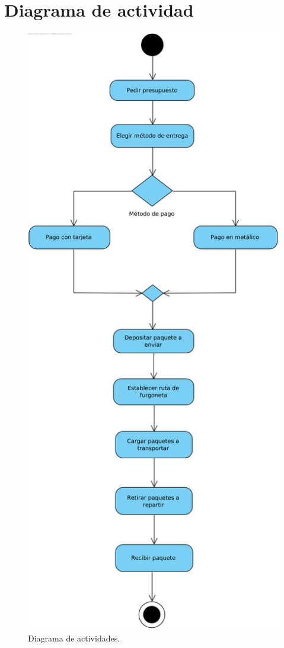 \documentclass[12pt,spanish]{article}
\begin{document}
\section{Diagrama de actividad}
\begin{figure}[H]
\centering
\includegraphics[scale=0.75]{actividad.png}
\caption{Diagrama de actividades.}
\end{figure}
\end{document}
